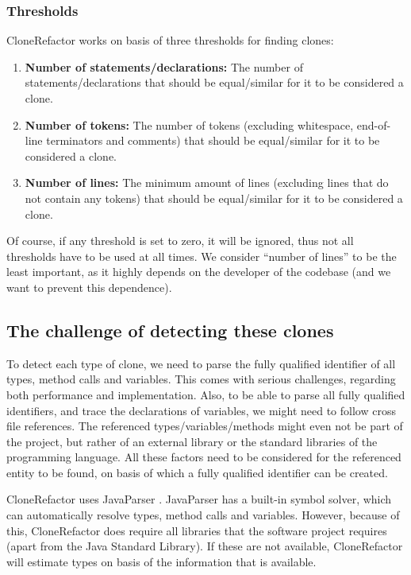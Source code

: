 \documentclass[a4paper]{article}
\begin{document}
\subsubsection{Thresholds}\label{chap:thresholds}
CloneRefactor works on basis of three thresholds for finding clones:
\begin{enumerate}
  \item \textbf{Number of statements/declarations:} The number of statements/declarations that should be equal/similar for it to be considered a clone.
  \item \textbf{Number of tokens:} The number of tokens (excluding whitespace, end-of-line terminators and comments) that should be equal/similar for it to be considered a clone.
  \item \textbf{Number of lines:} The minimum amount of lines (excluding lines that do not contain any tokens) that should be equal/similar for it to be considered a clone.
\end{enumerate}
Of course, if any threshold is set to zero, it will be ignored, thus not all thresholds have to be used at all times. We consider ``number of lines'' to be the least important, as it highly depends on the developer of the codebase (and we want to prevent this dependence).

\subsection{The challenge of detecting these clones}\label{chap:challenge}
To detect each type of clone, we need to parse the fully qualified identifier of all types, method calls and variables. This comes with serious challenges, regarding both performance and implementation. Also, to be able to parse all fully qualified identifiers, and trace the declarations of variables, we might need to follow cross file references. The referenced types/variables/methods might even not be part of the project, but rather of an external library or the standard libraries of the programming language. All these factors need to be considered for the referenced entity to be found, on basis of which a fully qualified identifier can be created.

CloneRefactor uses JavaParser \cite{tomassetti2017javaparser}. JavaParser has a built-in symbol solver, which can automatically resolve types, method calls and variables. However, because of this, CloneRefactor does require all libraries that the software project requires (apart from the Java Standard Library). If these are not available, CloneRefactor will estimate types on basis of the information that is available.
\end{document}
